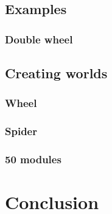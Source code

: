\documentclass[
  digital, %
  table,   %
  oneside, %
  nolof,     %
  nolot,     %
]{fithesis3}
\begin{document}
\section{Examples}

\subsection{Double wheel}


\section{Creating worlds}

\subsection{Wheel}

\subsection{Spider}

\subsection{50 modules}


\chapter{Conclusion}
\end{document}
